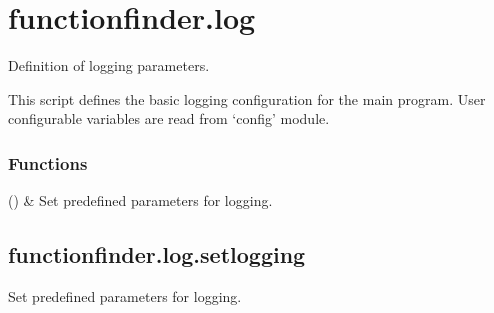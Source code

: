 \documentclass[letterpaper,10pt,english]{sphinxmanual}
\begin{document}
\sphinxstepscope


\section{functionfinder.log}
\label{\detokenize{_autosummary/functionfinder.log:module-functionfinder.log}}\label{\detokenize{_autosummary/functionfinder.log:functionfinder-log}}\label{\detokenize{_autosummary/functionfinder.log::doc}}
\sphinxAtStartPar
Definition of logging parameters.

\sphinxAtStartPar
This script defines the basic logging configuration for the main program.
User configurable variables are read from ‘config’ module.
\subsubsection*{Functions}


\begin{savenotes}\sphinxattablestart
\sphinxthistablewithglobalstyle
\sphinxthistablewithnovlinesstyle
\centering
\begin{tabulary}{\linewidth}[t]{}
\sphinxtoprule
\sphinxtableatstartofbodyhook
\sphinxAtStartPar
{\hyperref[\detokenize{_autosummary/functionfinder.log.setlogging:functionfinder.log.setlogging}]{}}()
&
\sphinxAtStartPar
Set predefined parameters for logging.
\\
\sphinxbottomrule
\end{tabulary}
\sphinxtableafterendhook\par
\sphinxattableend\end{savenotes}

\sphinxstepscope


\subsection{functionfinder.log.setlogging}
\label{\detokenize{_autosummary/functionfinder.log.setlogging:functionfinder-log-setlogging}}\label{\detokenize{_autosummary/functionfinder.log.setlogging::doc}}

\begin{fulllineitems}
\label{\detokenize{_autosummary/functionfinder.log.setlogging:functionfinder.log.setlogging}}
\pysigstartsignatures
{}
\pysigstopsignatures
\sphinxAtStartPar
Set predefined parameters for logging.

\end{fulllineitems}
\end{document}
